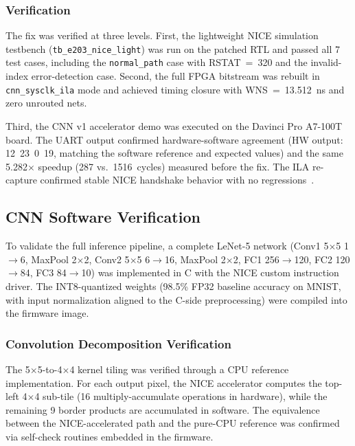 \subsubsection{Verification}

The fix was verified at three levels. First, the lightweight NICE simulation testbench (\texttt{tb\_e203\_nice\_light}) was run on the patched RTL and passed all 7 test cases, including the \texttt{normal\_path} case with RSTAT~=~320 and the invalid-index error-detection case. Second, the full FPGA bitstream was rebuilt in \texttt{cnn\_sysclk\_ila} mode and achieved timing closure with WNS~=~13.512~ns and zero unrouted nets.

Third, the CNN v1 accelerator demo was executed on the Davinci Pro A7-100T board. The UART output confirmed hardware-software agreement (HW output: 12~23~0~19, matching the software reference and expected values) and the same 5.282$\times$ speedup (287 vs.\ 1516~cycles) measured before the fix. The ILA re-capture confirmed stable NICE handshake behavior with no regressions~\cite{XILINX_UG908}.

\subsection{CNN Software Verification}\label{sec:4_5_3}

To validate the full inference pipeline, a complete LeNet-5 network (Conv1 5$\times$5 1$\to$6, MaxPool 2$\times$2, Conv2 5$\times$5 6$\to$16, MaxPool 2$\times$2, FC1 256$\to$120, FC2 120$\to$84, FC3 84$\to$10) was implemented in C with the NICE custom instruction driver. The INT8-quantized weights (98.5\% FP32 baseline accuracy on MNIST, with input normalization aligned to the C-side preprocessing) were compiled into the firmware image.

\subsubsection{Convolution Decomposition Verification}

The 5$\times$5-to-4$\times$4 kernel tiling was verified through a CPU reference implementation. For each output pixel, the NICE accelerator computes the top-left 4$\times$4 sub-tile (16 multiply-accumulate operations in hardware), while the remaining 9 border products are accumulated in software. The equivalence between the NICE-accelerated path and the pure-CPU reference was confirmed via self-check routines embedded in the firmware.

